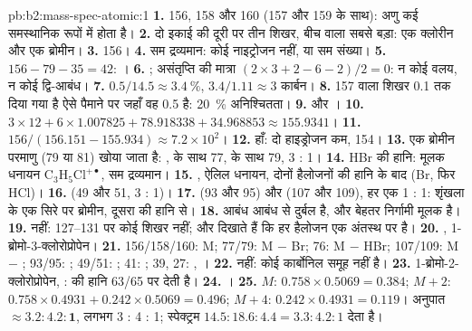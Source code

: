 \begin{solution}{pb:b2:mass-spec-atomic:1}
\textbf{1.} 156, 158 और 160 (157 और 159 के साथ): अणु कई समस्थानिक रूपों में होता है।
\textbf{2.} दो इकाई की दूरी पर तीन शिखर, बीच वाला सबसे बड़ा: एक क्लोरीन और एक ब्रोमीन।
\textbf{3.} 156।
\textbf{4.} सम द्रव्यमान: कोई नाइट्रोजन नहीं, या सम संख्या।
\textbf{5.} $156 - 79 - 35 = 42$: ।
\textbf{6.} ; असंतृप्ति की मात्रा $(2 \times 3 + 2 - 6 - 2)/2 = 0$: न कोई वलय, न कोई द्वि-आबंध।
\textbf{7.} $0.5/14.5 \approx 3.4~\%$, $3.4/1.11 \approx 3$ कार्बन।
\textbf{8.} 157 वाला शिखर 0.1 तक दिया गया है ऐसे पैमाने पर जहाँ वह 0.5 है: 20~\% अनिश्चितता।
\textbf{9.}  और ।
\textbf{10.} $3 \times 12 + 6 \times 1.007825 + 78.918338 + 34.968853 \approx 155.9341$।
\textbf{11.} $156/(156.151 - 155.934) \approx 7.2 \times 10^2$।
\textbf{12.} हाँ: दो हाइड्रोजन कम, 154।
\textbf{13.} एक ब्रोमीन परमाणु (79 या 81) खोया जाता है: ,  के साथ 77,  के साथ 79,
3 : 1।
\textbf{14.} HBr की हानि: मूलक धनायन $\mathrm{C_3H_5Cl^{+\bullet}}$, सम द्रव्यमान।
\textbf{15.} , ऐलिल धनायन, दोनों हैलोजनों की हानि के बाद (Br, फिर HCl)।
\textbf{16.}  (49 और 51, 3 : 1)।
\textbf{17.}  (93 और 95) और  (107 और 109), हर एक 1 : 1: शृंखला के एक सिरे पर ब्रोमीन,
दूसरा  की हानि से।
\textbf{18.}  आबंध  आबंध से दुर्बल है, और  बेहतर निर्गामी
मूलक है।
\textbf{19.} नहीं: 127--131 पर कोई शिखर नहीं;  और  दिखाते हैं कि हर हैलोजन एक अंतस्थ
 पर है।
\textbf{20.} , 1-ब्रोमो-3-क्लोरोप्रोपेन।
\textbf{21.} 156/158/160: M; 77/79: M $-$ Br; 76: M $-$ HBr; 107/109: M $-$ ;
93/95: ; 49/51: ; 41: ; 39, 27: , ।
\textbf{22.} नहीं: कोई कार्बोनिल समूह नहीं है।
\textbf{23.} 1-ब्रोमो-2-क्लोरोप्रोपेन, :  की हानि 63/65 पर  देती है।
\textbf{24.} ।
\textbf{25.} $M$: $0.758 \times 0.5069 = 0.384$; $M+2$: $0.758 \times 0.4931 + 0.242 \times 0.5069 =
0.496$; $M+4$: $0.242 \times 0.4931 = 0.119$। अनुपात $\boldsymbol{\approx 3.2 : 4.2 : 1}$, लगभग 3 : 4 :
1; स्पेक्ट्रम $14.5 : 18.6 : 4.4 = 3.3 : 4.2 : 1$ देता है।
\end{solution}
